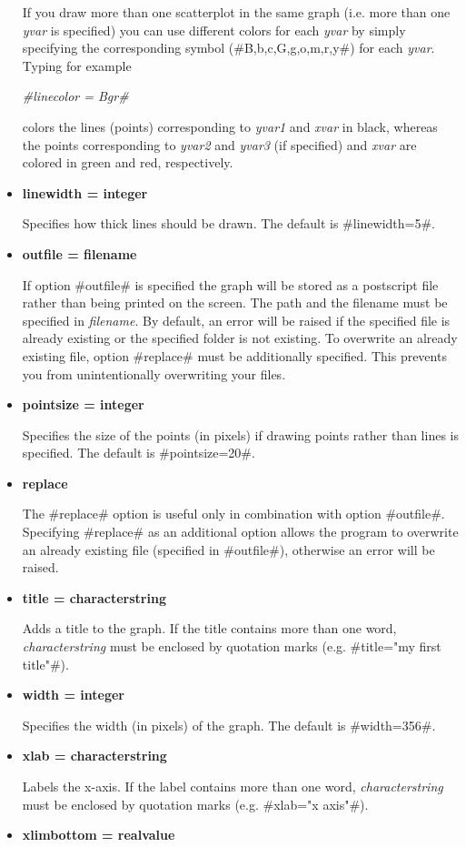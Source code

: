 \begin{itemize}
If you draw more than one scatterplot in the same graph (i.e. more
than one {\em yvar} is specified) you can use different colors for
each {\em yvar} by simply specifying the corresponding symbol
(#B,b,c,G,g,o,m,r,y#) for each {\em yvar}. Typing for example

{\em #linecolor = Bgr#}

colors the lines (points) corresponding to {\em yvar1} and {\em
xvar} in black, whereas the points corresponding to {\em yvar2}
and {\em yvar3} (if specified) and {\em xvar} are colored in green
and red, respectively.
\item {\bf linewidth = integer}

Specifies how thick lines should be drawn. The default is
#linewidth=5#.
\item {\bf outfile = filename}

If option #outfile# is specified the graph will be stored as a
postscript file rather than being printed on the screen. The path
and the filename must be specified in {\em filename}. By default,
an error will be raised if the specified file is already existing
or the specified folder is not existing. To overwrite  an already
existing file, option #replace# must be additionally specified.
This prevents you from unintentionally overwriting your files.
\item {\bf pointsize = integer}

Specifies the size of the points (in pixels) if drawing points
rather than lines is specified. The default is #pointsize=20#.

\item {\bf replace}

The #replace# option is useful only in combination with option
#outfile#. Specifying #replace# as an additional option allows the
program to overwrite an already existing file (specified in
#outfile#), otherwise an error will be raised.

\item {\bf title = characterstring}

Adds a title to the graph. If the title contains more than one
word, {\em characterstring} must be enclosed by quotation marks (e.g.
#title="my first title"#). \item {\bf width = integer}

Specifies the width (in pixels) of the graph. The default is
#width=356#. \item {\bf xlab = characterstring}

Labels the x-axis. If the label contains more than one word, {\em
characterstring} must be enclosed by quotation marks (e.g.
#xlab="x axis"#). \item {\bf xlimbottom = realvalue}


\end{itemize}

